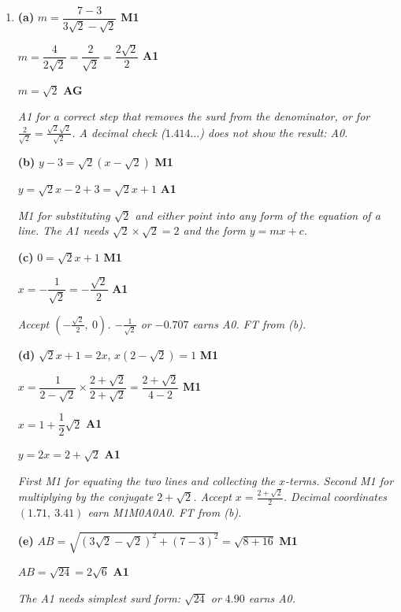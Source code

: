 \documentclass[12pt, twoside]{article}
\begin{document}
\begin{enumerate}[itemsep=0.3cm]
\newpage

\item[6.] [Maximum mark: 12]

\textbf{(a)} $m = \dfrac{7 - 3}{3\sqrt{2} - \sqrt{2}}$ \hfill \textbf{M1}

$m = \dfrac{4}{2\sqrt{2}} = \dfrac{2}{\sqrt{2}} = \dfrac{2\sqrt{2}}{2}$ \hfill \textbf{A1}

$m = \sqrt{2}$ \hfill \textbf{AG}

\emph{A1 for a correct step that removes the surd from the denominator, or
for $\frac{2}{\sqrt{2}} = \frac{\sqrt{2}\sqrt{2}}{\sqrt{2}}$. A decimal
check ($1.414\ldots$) does not show the result: A0.}

\textbf{(b)} $y - 3 = \sqrt{2}\left(x - \sqrt{2}\right)$ \hfill \textbf{M1}

$y = \sqrt{2}x - 2 + 3 = \sqrt{2}x + 1$ \hfill \textbf{A1}

\emph{M1 for substituting $\sqrt{2}$ and either point into any form of the
equation of a line. The A1 needs $\sqrt{2} \times \sqrt{2} = 2$ and the
form $y = mx + c$.}

\textbf{(c)} $0 = \sqrt{2}x + 1$ \hfill \textbf{M1}

$x = -\dfrac{1}{\sqrt{2}} = -\dfrac{\sqrt{2}}{2}$ \hfill \textbf{A1}

\emph{Accept $\left(-\frac{\sqrt{2}}{2},\ 0\right)$. $-\frac{1}{\sqrt{2}}$
or $-0.707$ earns A0. FT from (b).}

\textbf{(d)} $\sqrt{2}x + 1 = 2x$, \quad $x\left(2 - \sqrt{2}\right) = 1$ \hfill \textbf{M1}

$x = \dfrac{1}{2 - \sqrt{2}} \times \dfrac{2 + \sqrt{2}}{2 + \sqrt{2}} = \dfrac{2 + \sqrt{2}}{4 - 2}$ \hfill \textbf{M1}

$x = 1 + \dfrac{1}{2}\sqrt{2}$ \hfill \textbf{A1}

$y = 2x = 2 + \sqrt{2}$ \hfill \textbf{A1}

\emph{First M1 for equating the two lines and collecting the $x$-terms.
Second M1 for multiplying by the conjugate $2 + \sqrt{2}$. Accept
$x = \frac{2 + \sqrt{2}}{2}$. Decimal coordinates
$(1.71,\ 3.41)$ earn M1M0A0A0. FT from (b).}

\textbf{(e)} $AB = \sqrt{\left(3\sqrt{2} - \sqrt{2}\right)^{2} + (7 - 3)^{2}} = \sqrt{8 + 16}$ \hfill \textbf{M1}

$AB = \sqrt{24} = 2\sqrt{6}$ \hfill \textbf{A1}

\emph{The A1 needs simplest surd form: $\sqrt{24}$ or $4.90$ earns A0.}

\end{enumerate}
\end{document}
